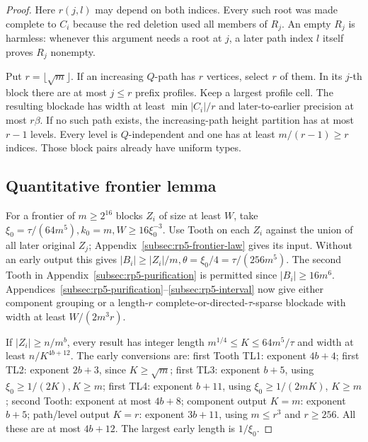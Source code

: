 \documentclass[11pt,a4paper]{article}
\theoremstyle{definition}
\theoremstyle{remark}
\numberwithin{equation}{section}
\begin{document}
\begin{proof}
Here \(r(j,\allowbreak l)\) may depend on both indices. Every such root was made complete to \(C_{i}\) because the red deletion used all members of \(R_{j}\). An empty \(R_{j}\) is harmless: whenever this argument needs a root at \(j\), a later path index \(l\) itself proves \(R_{j}\) nonempty.

Put \(r=\lfloor \sqrt{m}\rfloor\). If an increasing \(Q\)-path has \(r\) vertices, select \(r\) of them. In its \(j\)-th block there are at most \(j\le\allowbreak r\) prefix profiles. Keep a largest profile cell. The resulting blockade has width at least \(\min |C_{i}|/r\) and later-to-earlier precision at most \(r \beta\). If no such path exists, the increasing-path height partition has at most \(r-1\) levels. Every level is \(Q\)-independent and one has at least \(m/(r-1)\ge\allowbreak r\) indices. Those block pairs already have uniform types.
\subsection{Quantitative frontier lemma}\label{subsec:rp5-quantitative}
For a frontier of \(m\ge\allowbreak 2^{16}\) blocks \(Z_{i}\) of size at least \(W\), take \(\xi_{0}=\tau/(64m^{5}),\allowbreak  k_{0}=m,\allowbreak  W\ge\allowbreak 16\xi_{0}^{-3}\). Use Tooth on each \(Z_{i}\) against the union of all later original \(Z_{j}\); Appendix~\ref{subsec:rp5-frontier-law} gives its input. Without an early output this gives \(|B_{i}|\ge\allowbreak |Z_{i}|/m,\allowbreak  \theta=\xi_{0}/4=\tau/(256m^{5})\). The second Tooth in Appendix~\ref{subsec:rp5-purification} is permitted since \(|B_{i}|\ge\allowbreak 16m^{6}\). Appendices~\ref{subsec:rp5-purification}--\ref{subsec:rp5-interval} now give either component grouping or a length-\(r\) complete-or-directed-\(\tau\)-sparse blockade with width at least \(W/(2m^{3} r)\).

If \(|Z_{i}|\ge\allowbreak n/m^{b}\), every result has integer length \(m^{1/4}\le\allowbreak K\le\allowbreak 64m^{5}/\tau\) and width at least \(n/K^{4b+12}\). The early conversions are: first Tooth TL1: exponent \(4b+4\); first TL2: exponent \(2b+3\), since \(K\ge\allowbreak \sqrt{m}\); first TL3: exponent \(b+5\), using \(\xi_{0}\ge\allowbreak 1/(2K),\allowbreak  K\ge\allowbreak m\); first TL4: exponent \(b+11\), using \(\xi_{0}\ge 1/(2mK)\), \(K\ge m\); second Tooth: exponent at most \(4b+8\); component output \(K=m\): exponent \(b+5\); path/level output \(K=r\): exponent \(3b+11\), using \(m\le\allowbreak r^{3}\) and \(r\ge\allowbreak 256\). All these are at most \(4b+12\). The largest early length is \(1/\xi_{0}\).


\end{proof}
\end{document}
